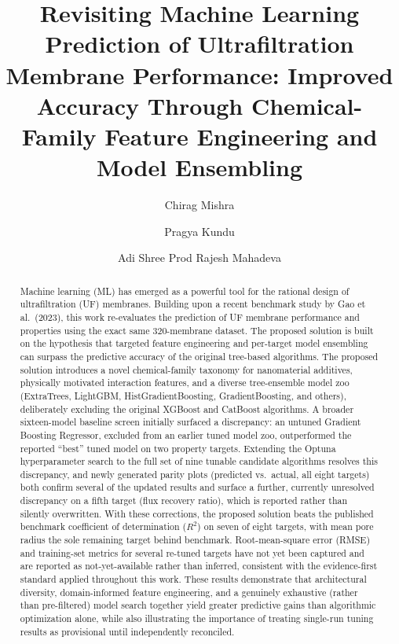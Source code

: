 \documentclass[11pt]{article}
\title{\textbf{Revisiting Machine Learning Prediction of Ultrafiltration Membrane Performance: Improved Accuracy Through Chemical-Family Feature Engineering and Model Ensembling}}
\author[a,*]{Chirag Mishra}
\author[a]{Pragya Kundu}
\author[b]{Adi Shree Prod Rajesh Mahadeva}
\affil[a]{Department of Civil and Environmental Engineering / Computer Science, [University Name], [City], [State] [Zip Code], [Country]}
\affil[b]{Department of Chemical and Materials Engineering, [University Name], [City], [State] [Zip Code], [Country]}
\affil[*]{Corresponding Author. Email: \texttt{chirag.mishra@email.com}}
\date{}
\begin{document}
\maketitle

\begin{abstract}
\noindent
Machine learning (ML) has emerged as a powerful tool for the rational design of ultrafiltration (UF) membranes. Building upon a recent benchmark study by Gao et al.\ (2023), this work re-evaluates the prediction of UF membrane performance and properties using the exact same 320-membrane dataset. The proposed solution is built on the hypothesis that targeted feature engineering and per-target model ensembling can surpass the predictive accuracy of the original tree-based algorithms. The proposed solution introduces a novel chemical-family taxonomy for nanomaterial additives, physically motivated interaction features, and a diverse tree-ensemble model zoo (ExtraTrees, LightGBM, HistGradientBoosting, GradientBoosting, and others), deliberately excluding the original XGBoost and CatBoost algorithms. A broader sixteen-model baseline screen initially surfaced a discrepancy: an untuned Gradient Boosting Regressor, excluded from an earlier tuned model zoo, outperformed the reported ``best'' tuned model on two property targets. Extending the Optuna hyperparameter search to the full set of nine tunable candidate algorithms resolves this discrepancy, and newly generated parity plots (predicted vs.\ actual, all eight targets) both confirm several of the updated results and surface a further, currently unresolved discrepancy on a fifth target (flux recovery ratio), which is reported rather than silently overwritten. With these corrections, the proposed solution beats the published benchmark coefficient of determination ($R^2$) on seven of eight targets, with mean pore radius the sole remaining target behind benchmark. Root-mean-square error (RMSE) and training-set metrics for several re-tuned targets have not yet been captured and are reported as not-yet-available rather than inferred, consistent with the evidence-first standard applied throughout this work. These results demonstrate that architectural diversity, domain-informed feature engineering, and a genuinely exhaustive (rather than pre-filtered) model search together yield greater predictive gains than algorithmic optimization alone, while also illustrating the importance of treating single-run tuning results as provisional until independently reconciled.
\end{abstract}
\end{document}

